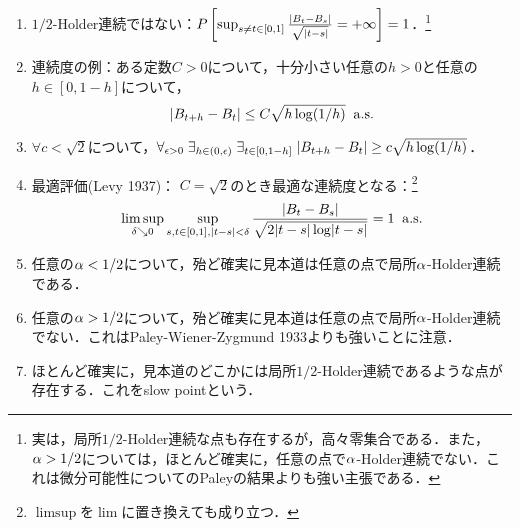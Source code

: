 \documentclass[uplatex,dvipdfmx]{jsreport}
\begin{document}
\begin{proposition}\mbox{}
    \begin{enumerate}
        \item $1/2$-Holder連続ではない：$P\left[\sup_{s\ne t\in[0,1]}\frac{\lvert B_t-B_s\rvert}{\sqrt{\lvert t-s\rvert}}=+\infty\right]=1$．\footnote{実は，局所$1/2$-Holder連続な点も存在するが，高々零集合である．また，$\alpha>1/2$については，ほとんど確実に，任意の点で$\alpha$-Holder連続でない．これは微分可能性についてのPaleyの結果よりも強い主張である．}
        \item 連続度の例：ある定数$C>0$について，十分小さい任意の$h>0$と任意の$h\in[0,1-h]$について，\[\lvert B_{t+h}-B_t\rvert\le C\sqrt{h\log(1/h)}\;\;\mathrm{a.s.}\]
        \item $\forall c<\sqrt{2}$について，$\forall_{\epsilon>0}\;\exists_{h\in(0,\epsilon)}\;\exists_{t\in[0,1-h]}\;\lvert B_{t+h}-B_t\rvert\ge c\sqrt{h\log(1/h)}$．
        \item 最適評価(Levy 1937)：
        $C=\sqrt{2}$のとき最適な連続度となる：\footnote{$\limsup$を$\lim$に置き換えても成り立つ．}
        \[\limsup_{\delta\searrow 0}\sup_{s,t\in[0,1],\lvert t-s\rvert<\delta}\frac{\lvert B_t-B_s\rvert}{\sqrt{2\lvert t-s\rvert\log\lvert t-s\rvert}}=1\;\;\mathrm{a.s.}\]
        \item 任意の$\alpha<1/2$について，殆ど確実に見本道は任意の点で局所$\alpha$-Holder連続である．
        \item 任意の$\alpha>1/2$について，殆ど確実に見本道は任意の点で局所$\alpha$-Holder連続でない．これはPaley-Wiener-Zygmund 1933よりも強いことに注意．
        \item ほとんど確実に，見本道のどこかには局所$1/2$-Holder連続であるような点が存在する．これをslow pointという．
    \end{enumerate}
\end{proposition}
\end{document}
